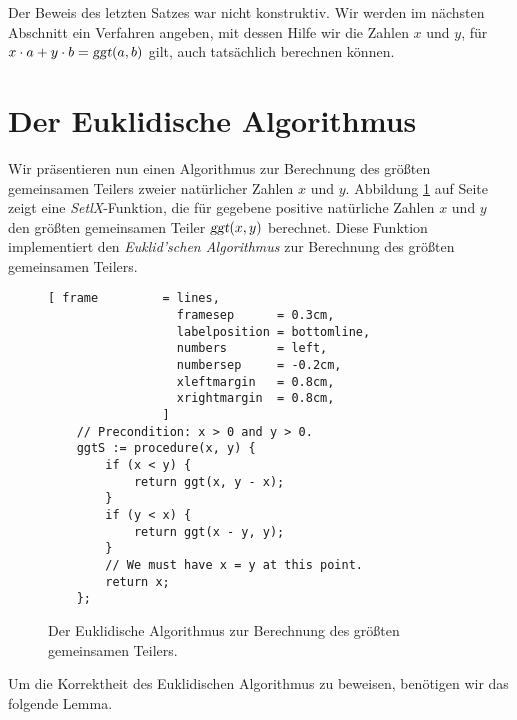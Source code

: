 \remark
Der Beweis des letzten Satzes war nicht konstruktiv.  Wir werden im nächsten Abschnitt ein
Verfahren angeben, mit dessen Hilfe wir die Zahlen $x$ und $y$, für 
$x \cdot a + y \cdot b = \textsl{ggt}(a, b)$ gilt, auch tatsächlich berechnen können.


\section{Der Euklidische Algorithmus}
Wir präsentieren nun einen Algorithmus zur Berechnung des größten gemeinsamen 
Teilers zweier natürlicher Zahlen $x$ und $y$.
 Abbildung \ref{fig:ggt.stlx} auf Seite \pageref{fig:ggt.stlx} zeigt eine
\textsl{SetlX}-Funktion, die für gegebene positive natürliche Zahlen $x$ und $y$ den größten gemeinsamen  Teiler 
$\textsl{ggt}(x,y)$ berechnet.  Diese Funktion implementiert den \emph{Euklid'schen
Algorithmus} zur Berechnung des größten gemeinsamen Teilers.


\begin{figure}[!ht]
\centering
\begin{Verbatim}[ frame         = lines, 
                  framesep      = 0.3cm, 
                  labelposition = bottomline,
                  numbers       = left,
                  numbersep     = -0.2cm,
                  xleftmargin   = 0.8cm,
                  xrightmargin  = 0.8cm,
                ]
    // Precondition: x > 0 and y > 0.
    ggtS := procedure(x, y) {
        if (x < y) {
            return ggt(x, y - x);
        }
        if (y < x) {
            return ggt(x - y, y); 
        }
        // We must have x = y at this point.
        return x;
    };
\end{Verbatim}
\vspace*{-0.3cm}
\caption{Der Euklidische Algorithmus zur Berechnung des größten gemeinsamen Teilers.}
\label{fig:ggt.stlx}
\end{figure}

Um die Korrektheit des Euklidischen Algorithmus zu beweisen, benötigen wir das folgende Lemma.


